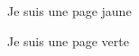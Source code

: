 \documentclass{article}
\begin{document}
	
	\pagecolor{yellow}
	
	Je suis une page jaune
	
	\newpage
	
	\pagecolor{green}
	
	Je suis une page verte
	
\end{document}
